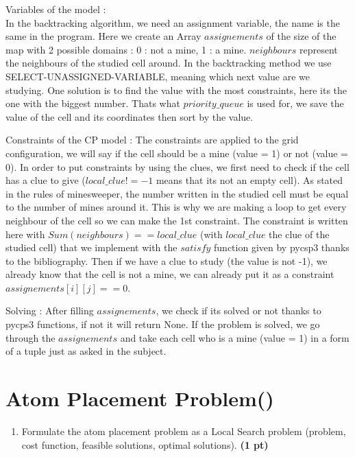 \documentclass[11pt,a4paper]{report}
\begin{document}
\begin{answers}[10cm]
    \item Variables of the model : \\
    In the backtracking algorithm, we need an assignment variable, the name is the same in the program. Here we create an Array $assignements$ of the size of the map with 2 possible domains : {0 : not a mine, 1 : a mine}. $neighbours$ represent the neighbours of the studied cell around. In the backtracking method we use SELECT-UNASSIGNED-VARIABLE, meaning which next value are we studying. One solution is to find the value with the most constraints, here its the one with the biggest number. Thats what $priority\_queue$ is used for, we save the value of the cell and its coordinates then sort by the value. 
    
    \item Constraints of the CP model : The constraints are applied to the grid configuration, we will say if the cell should be a mine (value = 1) or not (value = 0). In order to put constraints by using the clues, we first need to check if the cell has a clue to give ($local\_clue!=-1$ means that its not an empty cell). As stated in the rules of minesweeper, the number written in the studied cell must be equal to the number of mines around it. This is why we are making a loop to get every neighbour of the cell so we can make the 1st constraint. The constraint is written here with $Sum(neighbours) == local\_clue$ (with $local\_clue$ the clue of the studied cell) that we implement with the $satisfy$ function given by pycsp3 thanks to the bibliography. Then if we have a clue to study (the value is not -1), we already know that the cell is not a mine, we can already put it as a constraint $assignements[i][j] == 0$. 
    
    \item Solving : 
    After filling $assignements$, we check if its solved or not thanks to pycps3 functions, if not it will return None. If the problem is solved, we go through the $assignements$ and take each cell who is a mine (value = 1) in a form of a tuple just as asked in the subject.
\end{answers}




\newpage
\section{Atom Placement Problem()}
\begin{enumerate}
\item Formulate the atom placement problem as a Local Search problem (problem, cost function, feasible solutions, optimal solutions). \textbf{(1 pt)}
\end{enumerate}
\end{document}
